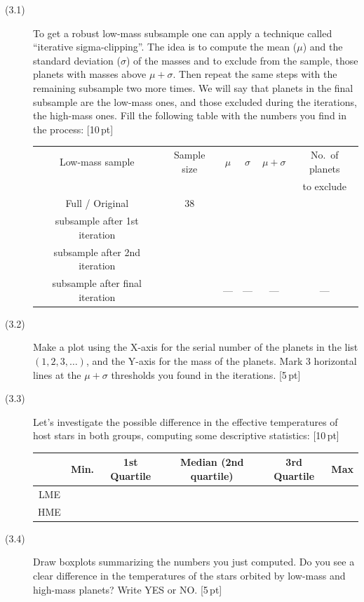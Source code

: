 \begin{description}
\item[(3.1)] To get a robust low-mass subsample one can apply a technique
  called ``iterative sigma-clipping''. The idea is to compute the mean ($\mu$)
  and the standard deviation ($\sigma$) of the masses and to exclude from the
  sample, those planets with masses above $\mu + \sigma$. Then repeat the same
  steps with the remaining subsample two more times. We will say that planets
  in the final subsample are the low-mass ones, and those excluded during the
  iterations, the high-mass ones. Fill the following table with the numbers
  you find in the process: \hfill[10\,pt]

  \begin{center}
  \begin{tabular}{cccccc}
  \toprule
  Low-mass sample & Sample size & $\mu$ & $\sigma$ & $\mu+\sigma$
    & No.\ of planets\\
  & & & & & to exclude\\
  \midrule
  Full / Original & 38 & & & & \\
  subsample after 1st iteration & & & & & \\
  subsample after 2nd iteration & & & & & \\
  subsample after final iteration & & --- & --- & --- & ---\\
  \bottomrule
  \end{tabular}
  \end{center}
\item[(3.2)] Make a plot using the X-axis for the serial number of the planets
  in the list $(1, 2, 3, \ldots)$, and the Y-axis for the mass of the
  planets. Mark 3 horizontal lines at the $\mu + \sigma$ thresholds you found
  in the iterations. \hfill[5\,pt]
\item[(3.3)] Let's investigate the possible difference in the effective
  temperatures of host stars in both groups, computing some descriptive
  statistics: \hfill[10\,pt]

  \begin{center}
  \begin{tabular}{cccccc}
  \toprule
  & Min. & 1st Quartile & Median (2nd quartile) & 3rd Quartile & Max\\
  \midrule
  LME & & & & & \\
  HME & & & & & \\
  \bottomrule
  \end{tabular}
  \end{center}
\item[(3.4)] Draw boxplots summarizing the numbers you just computed. Do you
  see a clear difference in the temperatures of the stars orbited by low-mass
  and high-mass planets? Write YES or NO. \hfill[5\,pt]


\end{description}
